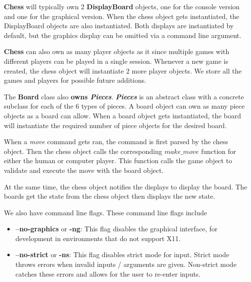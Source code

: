 \documentclass[12pt]{article}
\begin{document}
\textbf{Chess} will typically own 2 \textbf{DisplayBoard}
objects, one for the console version and
one for the graphical version. When the chess object gets instantiated, the 
DisplayBoard objects are also instantiated. Both
displays are instantiated by default, but
the graphics display can be omitted via a
command line argument.


\bigskip

\textbf{Chess} can also own as many player 
objects as it since multiple games with different players
can be played in a single session. Whenever
a new game is created, the chess object
will instantiate 2 more player objects.
We store all the games and players
for possible future additions.

\bigskip


The \textbf{Board} class also
\textbf{owns \textit{Pieces}}. 
\textbf{\textit{Pieces}} is an abstract class with
a concrete subclass for each of the 6 types of pieces.
A board object can own as many piece objects
as a board can allow. When a board
object gets instantiated, the board
will instantiate the required number
of piece objects for the desired board.

\bigskip

When a \textit{move} command gets
ran, the command is first parsed
by the chess object. Then the chess
object calls the corresponding
$make\_move$ function for either
the human or computer player. This
function calls the game object
to validate and execute the move
with the board object.

\bigskip

At the same time, the chess
object notifies the displays to
display the board. The boards
get the state from the chess
object then displays the
new state.

\bigskip

We also have command line flags. These command line flags include

\begin{itemize}
	\item \textbf{--no-graphics} or \textbf{-ng}: This flag disables the graphical interface, for development in environments that do not support X11.
        \item \textbf{--no-strict} or \textbf{-ns}: This flag disables strict mode for input. Strict mode throws errors when invalid inputs / arguments are given. Non-strict mode catches these errors and allows for the user to re-enter inputs.
\end{itemize}
\end{document}
